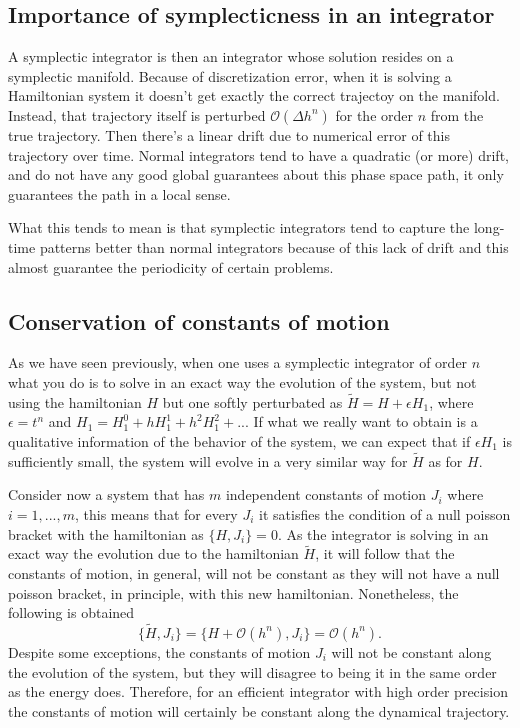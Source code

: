\subsection{Importance of symplecticness in an integrator}
A symplectic integrator is then an integrator whose solution resides on a symplectic manifold. Because of discretization error, when it is solving a Hamiltonian system it doesn't get exactly the correct trajectoy on the manifold. Instead, that trajectory itself is perturbed $\mathcal{O}(\Delta h^n)$ for the order $n$ from the true trajectory. Then there's a linear drift due to numerical error of this trajectory over time. Normal integrators tend to have a quadratic (or more) drift, and do not have any good global guarantees about this phase space path, it only guarantees the path in a local sense.\par




What this tends to mean is that symplectic integrators tend to capture the long-time patterns better than normal integrators because of this lack of drift and this almost guarantee the periodicity of certain problems. 

\subsection{Conservation of constants of motion}
As we have seen previously, when one uses a symplectic integrator of order $n$ what you do is to solve in an exact way the evolution of the system, but not using the hamiltonian $H$ but one softly perturbated as $\tilde{H}=H+\epsilon H_1$, where $\epsilon=t^n$ and $H_1=H_1^0+hH_1^1+h^2H_1^2+...$ If what we really want to obtain is a qualitative information of the behavior of the system, we can expect that if $\epsilon H_1$ is sufficiently small, the system will evolve in a very similar way for $\tilde{H}$ as for $H$.\par

Consider now a system that has $m$ independent constants of motion $J_i$ where $i=1,...,m$, this means that for every $J_i$ it satisfies the condition of a null poisson bracket with the hamiltonian as $\{H,J_i\}=0$. As the integrator is solving in an exact way the evolution due to the hamiltonian $\tilde{H}$, it will follow that the constants of motion, in general, will not be constant as they will not have a null poisson bracket, in principle, with this new hamiltonian. Nonetheless, the following is obtained
\begin{equation}
\{\tilde{H},J_i\}=\{H+\mathcal{O}(h^n),J_i\}=\mathcal{O}(h^n).
\end{equation}
Despite some exceptions, the constants of motion $J_i$ will not be constant along the evolution of the system, but they will disagree to being it in the same order as the energy does. Therefore, for an efficient integrator with high order precision the constants of motion will certainly be constant along the dynamical trajectory.




